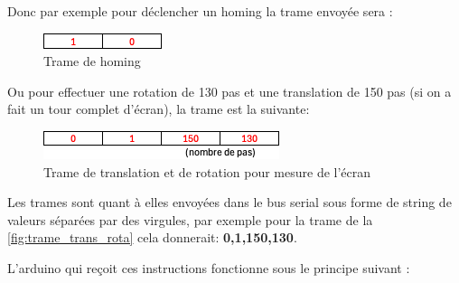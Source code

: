 Donc par exemple pour déclencher un homing la trame envoyée sera :
\begin{figure}[H]
    \centering
    \includegraphics[scale = 1.3]{assets/figures/ameliorations/trame_homing.png}
    \caption[Trame homing]{Trame de homing}
\end{figure}
Ou pour effectuer une rotation de 130 pas et une translation de 150 pas (si on a fait un tour complet d'écran), la trame est la suivante:
\begin{figure}[H]
    \centering
    \includegraphics[scale = 1.2]{assets/figures/ameliorations/trame_translation_rotation.png}
    \caption[Trame translation rotation]{Trame de translation et de rotation pour mesure de l'écran\label{fig:trame_trans_rota}}
\end{figure}

Les trames sont quant à elles envoyées dans le bus serial sous forme de string de valeurs séparées par des virgules, par exemple pour la trame
de la \autoref{fig:trame_trans_rota} cela donnerait: \textbf{0,1,150,130}.

L'arduino qui reçoit ces instructions fonctionne sous le principe suivant :

